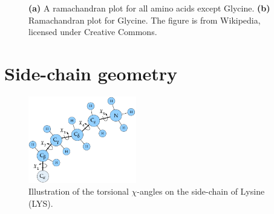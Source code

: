 \begin{figure}
	\centering
    \caption{\textbf{(a)} A ramachandran plot for all amino
      acids except Glycine. \textbf{(b)}  Ramachandran plot
      for Glycine. The figure is from Wikipedia, licensed under Creative Commons.}
\end{figure}


\section{Side-chain geometry}
\begin{figure}
	\centering
	\includegraphics[width=0.42\textwidth]{figures/lysine}
    \caption{Illustration of the torsional $\chi$-angles on the side-chain of Lysine (LYS).}
    \label{fig:lysine-and-chi}
\end{figure}

